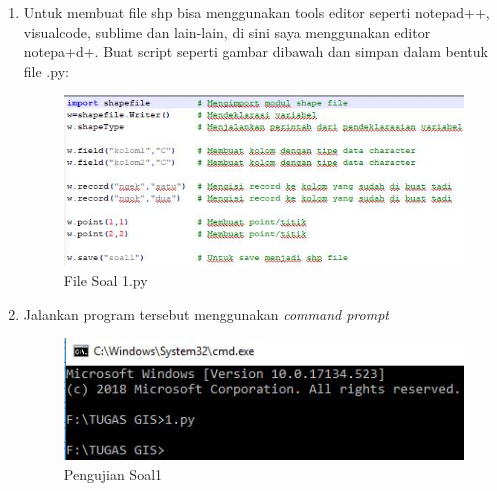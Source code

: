 \begin{enumerate}
\item Untuk membuat file shp bisa menggunakan tools editor seperti notepad++, visualcode, sublime dan lain-lain, di sini saya menggunakan editor notepa+d+.  Buat script seperti gambar dibawah dan simpan dalam bentuk file .py:
\begin{figure}[htbp]
\centering
\includegraphics[width=1\textwidth]{pictures/soal1.jpg}
\caption{File Soal 1.py}
\label{labelgambar4}
\end{figure}

\item Jalankan program tersebut menggunakan \textit{command prompt}

\begin{figure}[htbp]
\centering
\includegraphics[width=1\textwidth]{pictures/pengujiansoal1.jpg}
\caption{Pengujian Soal1}
\label{labelgambar5}
\end{figure}
\end{enumerate}

